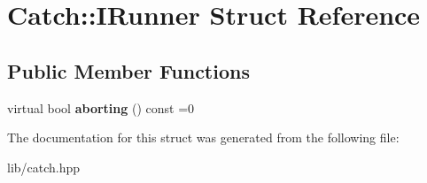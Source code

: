 \hypertarget{struct_catch_1_1_i_runner}{}\section{Catch\+:\+:I\+Runner Struct Reference}
\label{struct_catch_1_1_i_runner}
\subsection*{Public Member Functions}
\begin{DoxyCompactItemize}
\item 
\mbox{\label{struct_catch_1_1_i_runner_a03713202dd2e041e30b8030088ab0116}} 
virtual bool {\bfseries aborting} () const =0
\end{DoxyCompactItemize}


The documentation for this struct was generated from the following file\+:\begin{DoxyCompactItemize}
\item 
lib/catch.\+hpp\end{DoxyCompactItemize}
